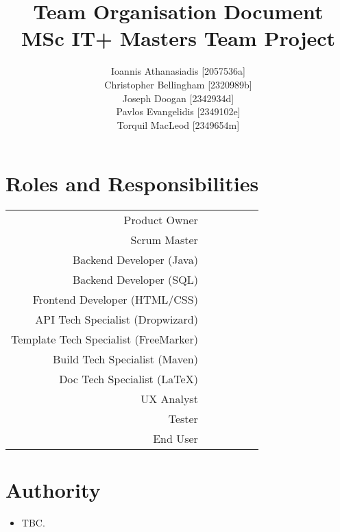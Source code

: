 \documentclass[a4paper, 12pt, titlepage]{article}
\title{\textbf{Team Organisation Document} \\ MSc IT+ Masters Team Project}
\author{
    Ioannis Athanasiadis [2057536a] \\
    Christopher Bellingham [2320989b] \\
    Joseph Doogan [2342934d] \\
    Pavlos Evangelidis [2349102e] \\
    Torquil MacLeod [2349654m]
}
\newcommand*\rot{\rotatebox{90}}
\begin{document}
    \maketitle

    \section{Roles and Responsibilities}
    \begin{center}
        \begin{tabular}{r*{5}c}
                                        & \rot{Ioannis Athanasiadis} & \rot{Christopher Bellingham} & \rot{Joseph Doogan} & \rot{Pavlos Evangelidis} & \rot{Torquil MacLeod} \\
            \hline
            Product Owner                               &     &     &     &     &     \\
            Scrum Master                                &     &     &     &     &     \\
            Backend Developer (Java)                    &     &     &     &     &     \\
            Backend Developer (SQL)                     &     &     &     &     &     \\
            Frontend Developer (HTML/CSS)               &     &     &     &     &     \\
            API Tech Specialist (Dropwizard)            &     &     &     &     &     \\
            Template Tech Specialist (FreeMarker)       &     &     &     &     &     \\
            Build Tech Specialist (Maven)               &     &     &     &     &     \\
            Doc Tech Specialist (LaTeX)                 &     &     &     &     &     \\
            UX Analyst                                  &     &     &     &     &     \\
            Tester                                      &     &     &     &     &     \\
            End User                                    &     &     &     &     &     \\
            \hline
        \end{tabular}
    \end{center}


    \section{Authority}
    \begin{itemize}
        \item TBC.
    \end{itemize}
\end{document}
